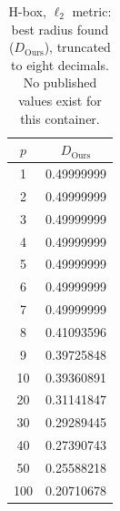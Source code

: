 \begin{table}[h!]
  \centering
  \caption{H-box, $\ell_2$ metric: best radius found ($D_{\mathrm{Ours}}$), truncated to eight decimals. No published values exist for this container.}
  \label{tab:h_box_euclidean}
  \begin{tabular}{cc}
    \hline
    $p$ & $D_{\mathrm{Ours}}$ \\
    \hline
    1 & 0.49999999 \\
    2 & 0.49999999 \\
    3 & 0.49999999 \\
    4 & 0.49999999 \\
    5 & 0.49999999 \\
    6 & 0.49999999 \\
    7 & 0.49999999 \\
    8 & 0.41093596 \\
    9 & 0.39725848 \\
    10 & 0.39360891 \\
    20 & 0.31141847 \\
    30 & 0.29289445 \\
    40 & 0.27390743 \\
    50 & 0.25588218 \\
    100 & 0.20710678 \\
    \hline
  \end{tabular}
\end{table}
